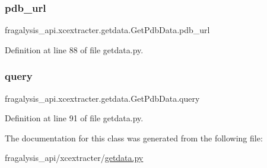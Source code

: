 \subsubsection{\texorpdfstring{pdb\+\_\+url}{pdb\_url}}
{\footnotesize\ttfamily fragalysis\+\_\+api.\+xcextracter.\+getdata.\+Get\+Pdb\+Data.\+pdb\+\_\+url}



Definition at line 88 of file getdata.\+py.

\mbox{\label{classfragalysis__api_1_1xcextracter_1_1getdata_1_1_get_pdb_data_ad09eb6782120b4d3114a9e5c3f66f373}} 
\subsubsection{\texorpdfstring{query}{query}}
{\footnotesize\ttfamily fragalysis\+\_\+api.\+xcextracter.\+getdata.\+Get\+Pdb\+Data.\+query}



Definition at line 91 of file getdata.\+py.



The documentation for this class was generated from the following file\+:\begin{DoxyCompactItemize}
\item 
fragalysis\+\_\+api/xcextracter/\hyperlink{getdata_8py}{getdata.\+py}\end{DoxyCompactItemize}
